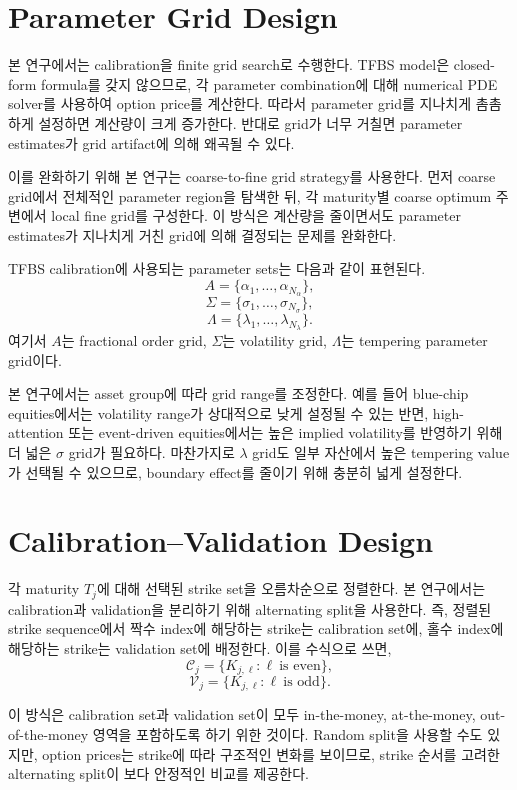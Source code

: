 \documentclass[11pt,a4paper]{report}
\begin{document}
\section{Parameter Grid Design}

본 연구에서는 calibration을 finite grid search로 수행한다. TFBS model은 closed-form formula를 갖지 않으므로, 각 parameter combination에 대해 numerical PDE solver를 사용하여 option price를 계산한다. 따라서 parameter grid를 지나치게 촘촘하게 설정하면 계산량이 크게 증가한다. 반대로 grid가 너무 거칠면 parameter estimates가 grid artifact에 의해 왜곡될 수 있다.

이를 완화하기 위해 본 연구는 coarse-to-fine grid strategy를 사용한다. 먼저 coarse grid에서 전체적인 parameter region을 탐색한 뒤, 각 maturity별 coarse optimum 주변에서 local fine grid를 구성한다. 이 방식은 계산량을 줄이면서도 parameter estimates가 지나치게 거친 grid에 의해 결정되는 문제를 완화한다.

TFBS calibration에 사용되는 parameter sets는 다음과 같이 표현된다.
\[
A=\{\alpha_1,\dots,\alpha_{N_\alpha}\},
\]
\[
\Sigma=\{\sigma_1,\dots,\sigma_{N_\sigma}\},
\]
\[
\Lambda=\{\lambda_1,\dots,\lambda_{N_\lambda}\}.
\]
여기서 $A$는 fractional order grid, $\Sigma$는 volatility grid, $\Lambda$는 tempering parameter grid이다.

본 연구에서는 asset group에 따라 grid range를 조정한다. 예를 들어 blue-chip equities에서는 volatility range가 상대적으로 낮게 설정될 수 있는 반면, high-attention 또는 event-driven equities에서는 높은 implied volatility를 반영하기 위해 더 넓은 $\sigma$ grid가 필요하다. 마찬가지로 $\lambda$ grid도 일부 자산에서 높은 tempering value가 선택될 수 있으므로, boundary effect를 줄이기 위해 충분히 넓게 설정한다.

\section{Calibration--Validation Design}

각 maturity $T_j$에 대해 선택된 strike set을 오름차순으로 정렬한다. 본 연구에서는 calibration과 validation을 분리하기 위해 alternating split을 사용한다. 즉, 정렬된 strike sequence에서 짝수 index에 해당하는 strike는 calibration set에, 홀수 index에 해당하는 strike는 validation set에 배정한다. 이를 수식으로 쓰면,
\[
\mathcal{C}_j
=
\{K_{j,\ell}:\ell\ \text{is even}\},
\]
\[
\mathcal{V}_j
=
\{K_{j,\ell}:\ell\ \text{is odd}\}.
\]

이 방식은 calibration set과 validation set이 모두 in-the-money, at-the-money, out-of-the-money 영역을 포함하도록 하기 위한 것이다. Random split을 사용할 수도 있지만, option prices는 strike에 따라 구조적인 변화를 보이므로, strike 순서를 고려한 alternating split이 보다 안정적인 비교를 제공한다.
\end{document}
